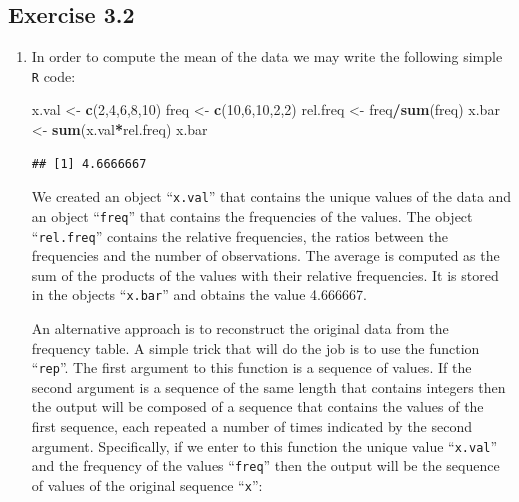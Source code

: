 \documentclass[]{krantz}
\makeatletter
\newenvironment{Shaded}{\begin{snugshade}}{\end{snugshade}}
\newcommand{\DecValTok}[1]{\textcolor[rgb]{0.00,0.00,0.81}{#1}}
\newcommand{\KeywordTok}[1]{\textcolor[rgb]{0.13,0.29,0.53}{\textbf{#1}}}
\newcommand{\NormalTok}[1]{#1}
\newcommand{\OperatorTok}[1]{\textcolor[rgb]{0.81,0.36,0.00}{\textbf{#1}}}
\newcommand{\StringTok}[1]{\textcolor[rgb]{0.31,0.60,0.02}{#1}}
\newenvironment{kframe}{%
\medskip{}
\setlength{\fboxsep}{.8em}
 \def\at@end@of@kframe{}%
 \ifinner\ifhmode%
  \def\at@end@of@kframe{\end{minipage}}%
  \begin{minipage}{\columnwidth}%
 \fi\fi%
 \def\FrameCommand##1{\hskip\@totalleftmargin \hskip-\fboxsep
 \colorbox{shadecolor}{##1}\hskip-\fboxsep
     \hskip-\linewidth \hskip-\@totalleftmargin \hskip\columnwidth}%
 \MakeFramed {\advance\hsize-\width
   \@totalleftmargin\z@ \linewidth\hsize
   \@setminipage}}%
 {\par\unskip\endMakeFramed%
 \at@end@of@kframe}
\renewenvironment{Shaded}{\begin{kframe}}{\end{kframe}}
\theoremstyle{definition}
\theoremstyle{definition}
\theoremstyle{definition}
\theoremstyle{remark}
\makeatother
\begin{document}
\hypertarget{exercise-3.2}{%
\subsection*{Exercise 3.2}\label{exercise-3.2}}


\begin{enumerate}
\def\labelenumi{\arabic{enumi}.}
\item
  In order to compute the mean
  of the data we may write the following simple \texttt{R} code:

\begin{Shaded}
\begin{Highlighting}[]
\NormalTok{x.val <-}\StringTok{ }\KeywordTok{c}\NormalTok{(}\DecValTok{2}\NormalTok{,}\DecValTok{4}\NormalTok{,}\DecValTok{6}\NormalTok{,}\DecValTok{8}\NormalTok{,}\DecValTok{10}\NormalTok{)}
\NormalTok{freq <-}\StringTok{ }\KeywordTok{c}\NormalTok{(}\DecValTok{10}\NormalTok{,}\DecValTok{6}\NormalTok{,}\DecValTok{10}\NormalTok{,}\DecValTok{2}\NormalTok{,}\DecValTok{2}\NormalTok{)}
\NormalTok{rel.freq <-}\StringTok{ }\NormalTok{freq}\OperatorTok{/}\KeywordTok{sum}\NormalTok{(freq)}
\NormalTok{x.bar <-}\StringTok{ }\KeywordTok{sum}\NormalTok{(x.val}\OperatorTok{*}\NormalTok{rel.freq)}
\NormalTok{x.bar}
\end{Highlighting}
\end{Shaded}

\begin{verbatim}
## [1] 4.6666667
\end{verbatim}

  We created an object ``\texttt{x.val}'' that contains the unique values of the
  data and an object ``\texttt{freq}'' that contains the frequencies of the values.
  The object ``\texttt{rel.freq}'' contains the relative frequencies, the ratios
  between the frequencies and the number of observations. The average is
  computed as the sum of the products of the values with their relative
  frequencies. It is stored in the objects ``\texttt{x.bar}'' and obtains the value
  4.666667.

  An alternative approach is to reconstruct the original data from the
  frequency table. A simple trick that will do the job is to use the
  function ``\texttt{rep}''. The first argument to this function is a sequence of
  values. If the second argument is a sequence of the same length that
  contains integers then the output will be composed of a sequence that
  contains the values of the first sequence, each repeated a number of
  times indicated by the second argument. Specifically, if we enter to
  this function the unique value ``\texttt{x.val}'' and the frequency of the values
  ``\texttt{freq}'' then the output will be the sequence of values of the original
  sequence ``\texttt{x}'':


\end{enumerate}
\end{document}
